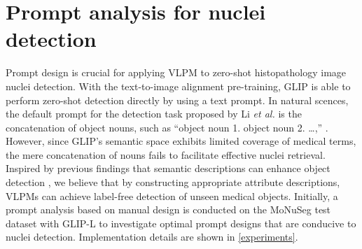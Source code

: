 \documentclass[journal,twoside,web]{ieeecolor}
\begin{document}



\section{Prompt analysis for nuclei detection}
\label{sec:promptana}
Prompt design is crucial for applying VLPM to zero-shot histopathology image nuclei detection. With the text-to-image alignment pre-training, GLIP is able to perform zero-shot detection directly by using a text prompt. In natural scences, the default prompt for the detection task proposed by Li \textit{et al.} is the concatenation of object nouns, such as ``object noun 1. object noun 2. …,'' \cite{li2022grounded}. However, since GLIP's semantic space exhibits limited coverage of medical terms, the mere concatenation of nouns fails to facilitate effective nuclei retrieval. Inspired by previous findings that semantic descriptions can enhance object detection \cite{li2022grounded,yamada2022lemons}, we believe that by constructing appropriate attribute descriptions, VLPMs can achieve label-free detection of unseen medical objects. Initially, a prompt analysis based on manual design is conducted on the MoNuSeg \cite{kumar2017dataset} test dataset with GLIP-L to investigate optimal prompt designs that are conducive to nuclei detection. Implementation details are shown in \autoref{experiments}.
\end{document}
